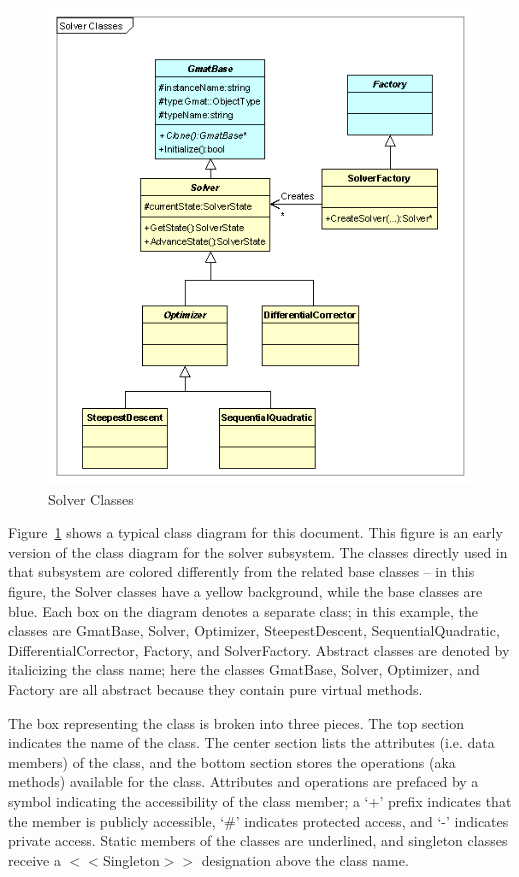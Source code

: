 \begin{figure}[htb!]
\begin{center}
\includegraphics[300,344]{Images/UmlClassSample.png}
\caption{\label{figure:UmlClassExample}Solver Classes}
\end{center}
\end{figure}

Figure~\ref{figure:UmlClassExample} shows a typical class diagram for this document.  This figure is
an early version of the class diagram for the solver subsystem.  The classes directly used in that
subsystem are colored differently from the related base classes -- in this figure, the Solver
classes have a yellow background, while the base classes are blue.  Each box on the diagram denotes
a separate class; in this example, the classes are GmatBase, Solver, Optimizer, SteepestDescent,
SequentialQuadratic, DifferentialCorrector, Factory, and SolverFactory.  Abstract classes are
denoted by italicizing the class name; here the classes GmatBase, Solver, Optimizer, and Factory are
all abstract because they contain pure virtual methods.

The box representing the class is broken into three pieces.  The top section indicates the name of
the class.  The center section lists the attributes (i.e. data members) of the class, and the bottom
section stores the operations (aka methods) available for the class.  Attributes and operations are
prefaced by a symbol indicating the accessibility of the class member; a `+' prefix indicates that
the member is publicly accessible, `\#' indicates protected access, and `-' indicates private
access.  Static members of the classes are underlined, and singleton classes receive a
$<<$Singleton$>>$ designation above the class name.

